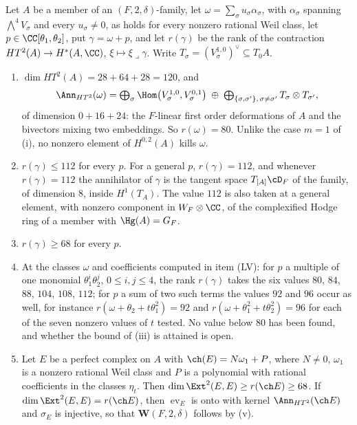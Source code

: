 \begin{theorem}[The corrected criterion for a quartic field at $n=2$]
\label{thm:quarticp2prime}
Let $A$ be a member of an $(F,2,\delta)$-family, let
$\omega=\sum_{\sigma}u_{\sigma}\alpha_{\sigma}$, with $\alpha_{\sigma}$ spanning
$\bigwedge^{4}V_{\sigma}$ and every $u_{\sigma}\ne0$, as holds for every
nonzero rational Weil class, let $p\in\CC[\theta_{1},\theta_{2}]$, put
$\gamma=\omega+p$, and let $r(\gamma)$ be the rank of the contraction
$HT^{2}(A)\to H^{*}(A,\CC)$, $\xi\mapsto\xi\lrcorner\gamma$. Write
$T_{\sigma}=(V_{\sigma}^{1,0})^{\vee}\subseteq T_{0}A$.
\begin{enumerate}[label=\textup{(\roman*)},leftmargin=2.6em,itemsep=2pt]
\item $\dim HT^{2}(A)=28+64+28=120$, and
  \[
    \Ann_{HT^{2}}(\omega)=\textstyle\bigoplus_{\sigma}
    \Hom\bigl(V_{\sigma}^{1,0},V_{\sigma}^{0,1}\bigr)\;\oplus\;
    \bigoplus_{\{\sigma,\sigma'\},\,\sigma\ne\sigma'}T_{\sigma}\otimes T_{\sigma'},
  \]
  of dimension $0+16+24$: the $F$-linear first order deformations of $A$ and
  the bivectors mixing two embeddings. So $r(\omega)=80$. Unlike the case
  $m=1$ of (i), no nonzero element of $H^{0,2}(A)$ kills
  $\omega$.
\item $r(\gamma)\le112$ for every $p$. For a general $p$, $r(\gamma)=112$, and
  whenever $r(\gamma)=112$ the annihilator of $\gamma$ is the tangent space
  $T_{[A]}\cD_{F}$ of the family, of dimension $8$, inside $H^{1}(T_{A})$. The
  value $112$ is also taken at a general element, with nonzero component in
  $W_{F}\otimes\CC$, of the complexified Hodge ring of a member with
  $\Hg(A)=G_{F}$.
\item $r(\gamma)\ge68$ for every $p$.
\item At the classes $\omega$ and coefficients computed in item (LV): for $p$
  a multiple of one monomial $\theta_{1}^{i}\theta_{2}^{j}$, $0\le i,j\le4$,
  the rank $r(\gamma)$ takes the six values $80$, $84$, $88$, $104$, $108$,
  $112$; for $p$ a sum of two such terms the values $92$ and $96$ occur as
  well, for instance $r(\omega+\theta_{2}+t\theta_{1}^{2})=92$ and
  $r(\omega+\theta_{1}^{2}+t\theta_{2}^{2})=96$ for each of the seven nonzero
  values of $t$ tested. No value below $80$ has been found, and whether the
  bound of \textup{(iii)} is attained is open.
\item Let $E$ be a perfect complex on $A$ with $\ch(E)=N\omega_{1}+P$, where
  $N\ne0$, $\omega_{1}$ is a nonzero rational Weil class and $P$ is a
  polynomial with rational coefficients in the classes $\eta_{t}$. Then
  $\dim\Ext^{2}(E,E)\ge r(\ch E)\ge68$. If $\dim\Ext^{2}(E,E)=r(\ch E)$, then
  $\operatorname{ev}_{E}$ is onto with kernel $\Ann_{HT^{2}}(\ch E)$ and
  $\sigma_{E}$ is injective, so that $\mathbf{W}(F,2,\delta)$ follows by
  (v).
\end{enumerate}
\end{theorem}

